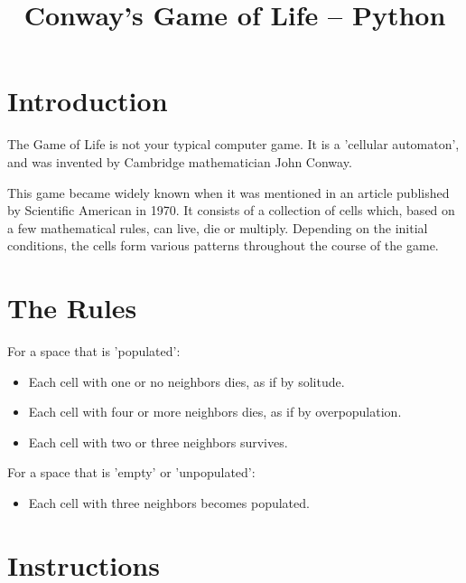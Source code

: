 \documentclass{article}
\begin{document}


\title{Conway's Game of Life -- Python}
\date{}

\vspace*{-3cm}
{\let\newpage\relax\maketitle}

\maketitle

\vspace{-2cm}

\section{Introduction}
The Game of Life is not your typical computer game. It is a 'cellular automaton', and was invented by Cambridge mathematician John Conway.

This game became widely known when it was mentioned in an article published by Scientific American in 1970. It consists of a collection of cells which, based on a few mathematical rules, can live, die or multiply. Depending on the initial conditions, the cells form various patterns throughout the course of the game. 

\section{The Rules}
For a space that is 'populated':
\begin{itemize}
	\item Each cell with one or no neighbors dies, as if by solitude. 
	\item Each cell with four or more neighbors dies, as if by overpopulation. 
	\item Each cell with two or three neighbors survives. 
\end{itemize}

For a space that is 'empty' or 'unpopulated':
\begin{itemize}
	\item Each cell with three neighbors becomes populated. 
\end{itemize}

\section{Instructions}
\end{document}
